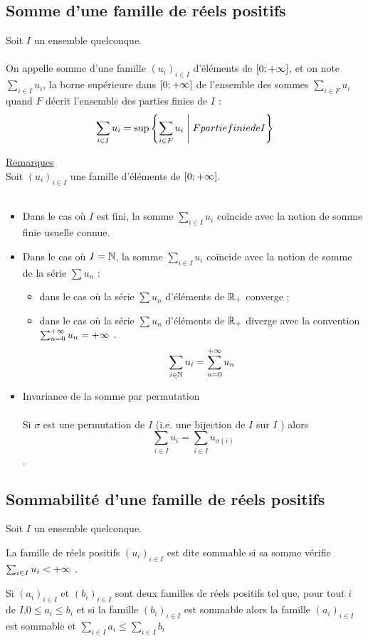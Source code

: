 \subsection{Somme d’une famille de réels positifs}
\begin{defprop}
    Soit \(I\) un ensemble quelconque.\\~\\
    On appelle somme d’une famille \((u_i)_{i\in I}\) d’éléments de \(\left[0;+\infty\right]\), et on note \(\sum_{i\in I} u_i\), la borne supérieure dans \(\left[0;+\infty\right]\) de l’ensemble des sommes \(\sum_{i\in F}u_i\) quand \(F\) décrit l’ensemble des parties finies de \(I\) :
    \[\sum_{i\in I}u_i = \sup \left\lbrace\sum_{i\in F}u_i \;\middle|\; F partie finie de I\right\rbrace\]

    \underline{Remarques}\\
    Soit \((u_i)_{i\in I}\) une famille d’éléments de \(\left[0;+\infty\right]\).\\~\\
    \begin{itemize}
        \item Dans le cas où \(I\) est fini, la somme \(\sum_{i\in I}u_i\) coïncide avec la notion de somme finie usuelle connue.
        \item Dans le cas où \(I = \mathbb{N}\), la somme \(\sum_{i\in I}u_i\) coïncide avec la notion de somme de la série \(\sum u_n\) :
        \begin{itemize}
            \item dans le cas où la série \(\sum u_n\) d’éléments de \(\mathbb{R}_+\) converge ;
            \item dans le cas où la série \(\sum u_n\) d’éléments de \(\mathbb{R}_+\) diverge avec la convention \(\sum^{+\infty}_{n=0}u_n = +\infty\) .
            \[\sum_{i\in \mathbb{N}}u_i =\sum^{+\infty}_{n=0}u_n\]
        \end{itemize}
        \item Invariance de la somme par permutation\\~\\
            Si \(\sigma\) est une permutation de \(I\) (i.e. une bijection de \(I\) sur \(I\) ) alors
            \[\sum_{i\in I}u_i = \sum_{i\in I}u_{\sigma(i)}\].
    \end{itemize}
\end{defprop}

\subsection{Sommabilité d’une famille de réels positifs}
    Soit \(I\) un ensemble quelconque.
\begin{defi}
    La famille de réels positifs \((u_i)_{i\in I}\) est dite sommable si sa somme vérifie \(\sum_{i\in I}u_i < +\infty\) .
\end{defi}
\begin{prop}
    Si \((a_i)_{i\in I}\) et \((b_i)_{i\in I}\) sont deux familles de réels positifs tel que, pour tout \(i\) de \(I\),\( 0 \leq  a_i \leq  b_i\) et si la famille \((b_i)_{i\in I}\) est sommable alors la famille \((a_i)_{i\in I}\) est sommable et \(\sum_{i\in I}a_i \leq  \sum_{i\in I}b_i\)
\end{prop}
